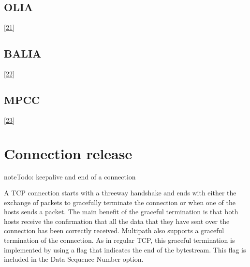 \documentclass[letterpaper,10pt,english]{sphinxmanual}
\begin{document}
\subsection{OLIA}
\label{\detokenize{mptcp:olia}}
\sphinxAtStartPar
{[}\hyperlink{cite.biblio:id8951}{21}{]}


\subsection{BALIA}
\label{\detokenize{mptcp:balia}}
\sphinxAtStartPar
{[}\hyperlink{cite.biblio:id8993}{22}{]}


\subsection{MPCC}
\label{\detokenize{mptcp:mpcc}}
\sphinxAtStartPar
{[}\hyperlink{cite.biblio:id9002}{23}{]}


\section{Connection release}
\label{\detokenize{mptcp:connection-release}}\label{\detokenize{mptcp:mptcp-release}}
\begin{sphinxadmonition}{note}{\label{\detokenize{mptcp:id33}}Todo:}
\sphinxAtStartPar
keepalive and end of a connection
\end{sphinxadmonition}

\sphinxAtStartPar
A TCP connection starts with a three\sphinxhyphen{}way handshake and ends with either the exchange of  packets to gracefully terminate the connection or when one of the hosts sends a  packet. The main benefit of the graceful termination is that both hosts receive the confirmation that all the data that they have sent over the connection has been correctly received. Multipath also supports a graceful termination of the connection. As in regular TCP, this graceful termination is implemented by using a flag that indicates the end of the bytestream. This flag is included in the Data Sequence Number option.
\end{document}
